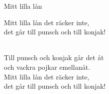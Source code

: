 \begin{song}{Mitt lilla lån}
	
	
	
	\begin{repetition}
		Mitt lilla lån det räcker inte,\\
		det går till punsch och till konjak!
	\end{repetition}\\
	Till punsch och konjak går det åt\\
	och vackra pojkar emellanåt.\\
	Mitt lilla lån det räcker inte,\\
	det går till punsch och till konjak!
	
\end{song}
